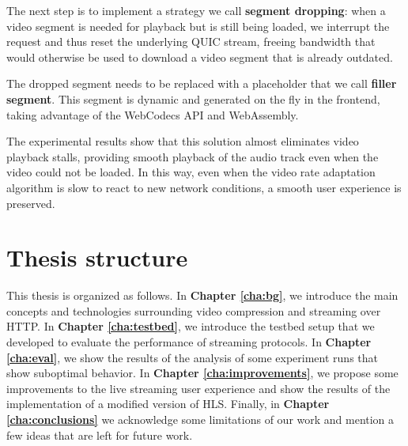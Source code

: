 The next step is to implement a strategy we call \textbf{segment dropping}: when a video segment is needed for playback but is still being loaded, we interrupt the request and thus reset the underlying QUIC stream, freeing bandwidth that would otherwise be used to download a video segment that is already outdated.

The dropped segment needs to be replaced with a placeholder that we call \textbf{filler segment}. This segment is dynamic and generated on the fly in the frontend, taking advantage of the WebCodecs API and WebAssembly.

The experimental results show that this solution almost eliminates video playback stalls, providing smooth playback of the audio track even when the video could not be loaded. In this way, even when the video rate adaptation algorithm is slow to react to new network conditions, a smooth user experience is preserved.

\section{Thesis structure}
\label{sec:intro/structure}

This thesis is organized as follows. In \textbf{Chapter \ref{cha:bg}}, we introduce the main concepts and technologies surrounding video compression and streaming over HTTP. In \textbf{Chapter \ref{cha:testbed}}, we introduce the testbed setup that we developed to evaluate the performance of streaming protocols. In \textbf{Chapter \ref{cha:eval}}, we show the results of the analysis of some experiment runs that show suboptimal behavior. In \textbf{Chapter \ref{cha:improvements}}, we propose some improvements to the live streaming user experience and show the results of the implementation of a modified version of HLS. Finally, in \textbf{Chapter \ref{cha:conclusions}} we acknowledge some limitations of our work and mention a few ideas that are left for future work.

